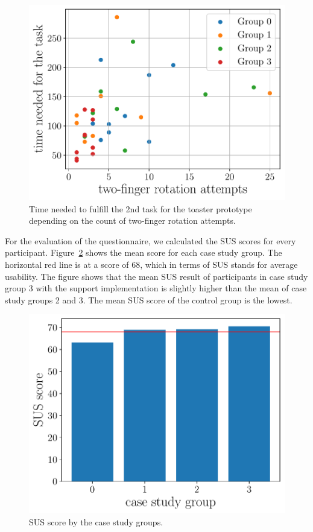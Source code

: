 \documentclass[manuscript]{acmart}
\begin{document}
			\begin{figure}[H]
				\centering
				\includegraphics[width=.49\textwidth]{img/plot/plot_scatter.pdf}
				\caption{Time needed to fulfill the 2nd task for the toaster prototype depending on the count of two-finger rotation attempts.}
				\label{fig:scatter}
			\end{figure}

			For the evaluation of the questionnaire, we calculated the \ac{SUS} scores for every participant. Figure~\ref{fig:sus} shows the mean score for each case study group. The horizontal red line is at a score of 68, which in terms of \ac{SUS} stands for average usability. The figure shows that the mean \ac{SUS} result of participants in case study group 3 with the support implementation is slightly higher than the mean of case study groups 2 and 3. The mean \ac{SUS} score of the control group is the lowest.

			\begin{figure}[H]
				\centering
				\includegraphics[width=.49\textwidth]{img/plot/plot_sus.pdf}
				\caption{SUS score by the case study groups.}
				\label{fig:sus}
			\end{figure}
\end{document}
